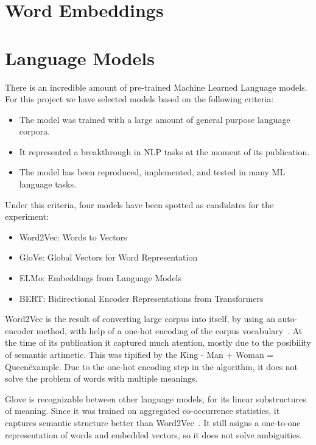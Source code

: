 \section{Word Embeddings}\label{sec:Word Embeddings}


\section{Language Models}\label{sec:Language Models}
There is an incredible amount of pre-trained Machine Learned Language models. For this project we have selected models based on the following criteria:

\begin{itemize}
  \item The model was trained with a large amount of general purpose language corpora.
  \item It represented a breakthrough in NLP tasks at the moment of its publication.
  \item The model has been reproduced, implemented, and tested in many ML language tasks.
\end{itemize}

Under this criteria, four models have been spotted as candidates for the experiment:
\begin{itemize}
  \item Word2Vec: Words to Vectors
  \item GloVe: Global Vectors for Word Representation
  \item ELMo: Embeddings from Language Models
  \item BERT: Bidirectional Encoder Representations from Transformers
\end{itemize}

Word2Vec is the result of converting large corpus into itself, by using an auto-encoder method, with help of a one-hot encoding of the corpus vocabulary~\cite{TODO}. At the time of its publication it captured much atention, mostly due to the posibility of semantic artimetic. This was tipified by the \"King - Man + Woman = Queen\" example. Due to the one-hot encoding step in the algorithm, it does not solve the problem of words with multiple meanings.

Glove is recognizable between other language models, for its linear substructures of meaning. Since it was trained on aggregated co-occurrence statistics, it captures semantic structure better than Word2Vec~\cite{TODO}. It still asigns a one-to-one representation of words and embedded vectors, so it does not solve ambiguities.

